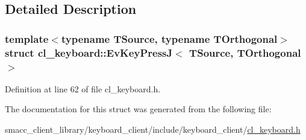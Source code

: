 \subsection{Detailed Description}
\subsubsection*{template$<$typename T\+Source, typename T\+Orthogonal$>$\newline
struct cl\+\_\+keyboard\+::\+Ev\+Key\+Press\+J$<$ T\+Source, T\+Orthogonal $>$}



Definition at line 62 of file cl\+\_\+keyboard.\+h.



The documentation for this struct was generated from the following file\+:\begin{DoxyCompactItemize}
\item 
smacc\+\_\+client\+\_\+library/keyboard\+\_\+client/include/keyboard\+\_\+client/\hyperlink{cl__keyboard_8h}{cl\+\_\+keyboard.\+h}\end{DoxyCompactItemize}
